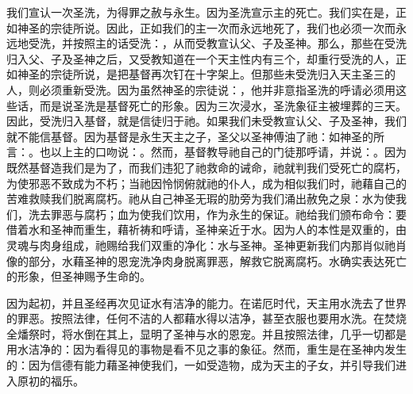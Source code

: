 我们宣认一次圣洗，为得罪之赦与永生。因为圣洗宣示主的死亡。我们实在是，正如神圣的宗徒所说。因此，正如我们的主一次而永远地死了，我们也必须一次而永远地受洗，并按照主的话受洗：，从而受教宣认父、子及圣神。那么，那些在受洗归入父、子及圣神之后，又受教知道在一个天主性内有三个，却重行受洗的人，正如神圣的宗徒所说，是把基督再次钉在十字架上。但那些未受洗归入天主圣三的人，则必须重新受洗。因为虽然神圣的宗徒说：，他并非意指圣洗的呼请必须用这些话，而是说圣洗是基督死亡的形象。因为三次浸水，圣洗象征主被埋葬的三天。因此，受洗归入基督，就是信徒归于祂。如果我们未受教宣认父、子及圣神，我们就不能信基督。因为基督是永生天主之子，圣父以圣神傅油了祂：如神圣的所言：。也以上主的口吻说：。然而，基督教导祂自己的门徒那呼请，并说：。因为既然基督造我们是为了，而我们违犯了祂救命的诫命，祂就判我们受死亡的腐朽，为使邪恶不致成为不朽；当祂因怜悯俯就祂的仆人，成为相似我们时，祂藉自己的苦难救赎我们脱离腐朽。祂从自己神圣无瑕的肋旁为我们涌出赦免之泉：水为使我们，洗去罪恶与腐朽；血为使我们饮用，作为永生的保证。祂给我们颁布命令：要借着水和圣神而重生，藉祈祷和呼请，圣神亲近于水。因为人的本性是双重的，由灵魂与肉身组成，祂赐给我们双重的净化：水与圣神。圣神更新我们内那肖似祂肖像的部分，水藉圣神的恩宠洗净肉身脱离罪恶，解救它脱离腐朽。水确实表达死亡的形象，但圣神赐予生命的。\par

因为起初，并且圣经再次见证水有洁净的能力。在诺厄时代，天主用水洗去了世界的罪恶。按照法律，任何不洁的人都藉水得以洁净，甚至衣服也要用水洗。在焚烧全燔祭时，将水倒在其上，显明了圣神与水的恩宠。并且按照法律，几乎一切都是用水洁净的：因为看得见的事物是看不见之事的象征。然而，重生是在圣神内发生的：因为信德有能力藉圣神使我们，一如受造物，成为天主的子女，并引导我们进入原初的福乐。\par

